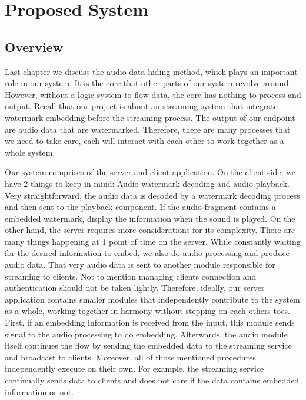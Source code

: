 \chapter{Proposed System}
\section{Overview}
Last chapter we discuss the audio data hiding method, which plays an important role in our system. It is the core that other parts of our system revolve around. However, without a logic system to flow data, the core has nothing to process and output. Recall that our project is about an streaming system that integrate watermark embedding before the streaming process. The output of our endpoint are audio data that are watermarked. Therefore, there are many processes that we need to take care, each will interact with each other to work together as a whole system.

Our system comprises of the server and client application. On the client side, we have 2 things to keep in mind: Audio watermark decoding and audio playback. Very straightforward, the audio data is decoded by a watermark decoding process and then sent to the playback component. If the audio fragment contains a embedded watermark, display the information when the sound is played. On the other hand, the server requires more considerations for its complexity. There are many things happening at 1 point of time on the server. While constantly waiting for the desired information to embed, we also do audio processing and produce audio data. That very audio data is sent to another module responsible for streaming to clients. Not to mention managing clients connection and authentication should not be taken lightly. Therefore, ideally, our server application contains smaller modules that independently contribute to the system as a whole, working together in harmony without stepping on each others toes. First, if an embedding information is received from the input, this module sends signal to the audio processing to do embedding. Afterwards, the audio module itself continues the flow by sending the embedded data to the streaming service and broadcast to clients. Moreover, all of those mentioned procedures independently execute on their own. For example, the streaming service continually sends data to clients and does not care if the data contains embedded information or not. 

